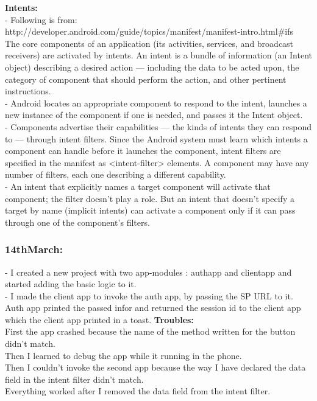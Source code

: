 \documentclass[11pt]{article}
\begin{document}
\textbf{Intents:}\\
- Following is from: http://developer.android.com/guide/topics/manifest/manifest-intro.html\#ifs\\
The core components of an application (its activities, services, and broadcast receivers) are activated by intents. An intent is a bundle of 
information (an Intent object) describing a desired action — including the data to be acted upon, the category of component that should perform the 
action, and other pertinent instructions. \\

- Android locates an appropriate component to respond to the intent, launches a new instance of the 
component if one is needed, and passes it the Intent object.\\

- Components advertise their capabilities — the kinds of intents they can respond to — through intent filters. Since the Android system must learn 
which intents a component can handle before it launches the component, intent filters are specified in the manifest as <intent-filter> elements. A 
component may have any number of filters, each one describing a different capability.\\

- An intent that explicitly names a target component will activate that component; the filter doesn't play a role. But an intent that doesn't specify 
a target by name (implicit intents) can activate a component only if it can pass through one of the component's filters. 

\subsubsection*{14thMarch:}
- I created a new project with two app-modules : authapp and clientapp and started adding the basic logic to it.\\
- I made the client app to invoke the auth app, by passing the SP URL to it.\\
Auth app printed the passed infor and returned the session id to the client app which the client app printed in a toast.
 \textbf{Troubles:}\\
 First the app crashed because the name of the method written for the button didn't match.\\
 Then I learned to debug the app while it running in the phone.\\
 Then I couldn't invoke the second app because the way I have declared the data field in the intent filter didn't match.\\
 Everything worked after I removed the data field from the intent filter.
 
\end{document}
